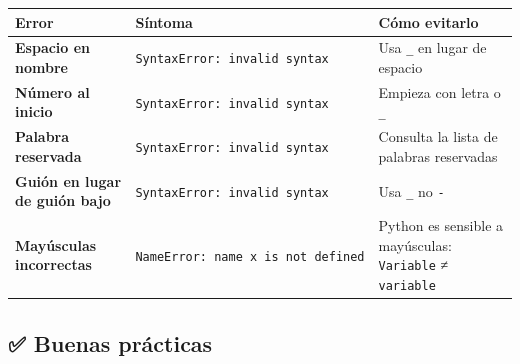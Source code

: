 \documentclass[
  doc,
  floatsintext,
  longtable,
  a4paper,
  nolmodern,
  notxfonts,
  notimes,
  12pt,
  colorlinks=true,linkcolor=blue,citecolor=blue,urlcolor=blue]{apa7}
\newcounter{none} %
\begin{document}
{\def\LTcaptype{none} %
\begin{longtable}[]{@{}
  >{\raggedright\arraybackslash}p{}
  >{\raggedright\arraybackslash}p{}
  >{\raggedright\arraybackslash}p{}@{}}
\toprule\noalign{}
\begin{minipage}[b]{\linewidth}\raggedright
Error
\end{minipage} & \begin{minipage}[b]{\linewidth}\raggedright
Síntoma
\end{minipage} & \begin{minipage}[b]{\linewidth}\raggedright
Cómo evitarlo
\end{minipage} \\
\midrule\noalign{}
\endhead
\bottomrule\noalign{}
\endlastfoot
\textbf{Espacio en nombre} & \texttt{SyntaxError:\ invalid\ syntax} &
Usa \texttt{\_} en lugar de espacio \\
\textbf{Número al inicio} & \texttt{SyntaxError:\ invalid\ syntax} &
Empieza con letra o \texttt{\_} \\
\textbf{Palabra reservada} & \texttt{SyntaxError:\ invalid\ syntax} &
Consulta la lista de palabras reservadas \\
\textbf{Guión en lugar de guión bajo} &
\texttt{SyntaxError:\ invalid\ syntax} & Usa \texttt{\_} no
\texttt{-} \\
\textbf{Mayúsculas incorrectas} &
\texttt{NameError:\ name\ \textquotesingle{}x\textquotesingle{}\ is\ not\ defined}
& Python es sensible a mayúsculas: \texttt{Variable} ≠
\texttt{variable} \\
\end{longtable}
}

\subsection{✅ Buenas prácticas}\label{buenas-pruxe1cticas}
\end{document}
